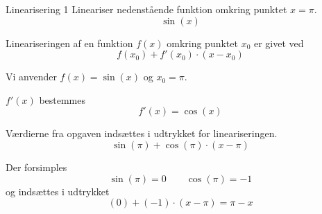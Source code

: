 \documentclass{article}
\begin{document}
\tableofcontents
\newpage


\begin{exercise}{Linearisering 1}
Lineariser nedenstående funktion omkring punktet $x = \pi$.
\[
\sin(x)
\]


\hint
Lineariseringen af en funktion $f(x)$
omkring punktet $x_0$ er givet ved
\[
f(x_0) + f'(x_0) \cdot (x - x_0)
\]

\hint
Vi anvender $f(x) = \sin(x)$ og $x_0 = \pi$.

\hint
$f'(x)$ bestemmes
\[
f'(x) = \cos(x)
\]

\hint
Værdierne fra opgaven indsættes i udtrykket for lineariseringen.
\[
\sin(\pi) + \cos(\pi) \cdot (x - \pi)
\]

\hint
Der forsimples
\[
\sin(\pi) = 0 \qquad 
\cos(\pi) = -1
\]
og indsættes i udtrykket
\[
(0) + (-1) \cdot (x - \pi) = 
\pi - x
\]

\end{exercise}
\end{document}

